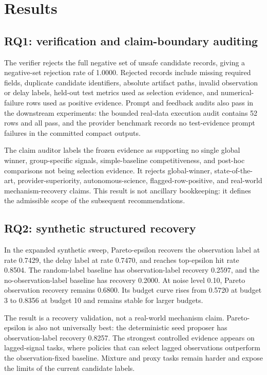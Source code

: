 \section{Results}

\subsection{RQ1: verification and claim-boundary auditing}

The verifier rejects the full negative set of unsafe candidate records, giving
a negative-set rejection rate of \num{1.0000}. Rejected records include
missing required fields, duplicate candidate identifiers, absolute artifact
paths, invalid observation or delay labels, held-out test metrics used as
selection evidence, and numerical-failure rows used as positive evidence.
Prompt and feedback audits also pass in the downstream experiments: the
bounded real-data execution audit contains 52 rows and all pass, and the
provider benchmark records no test-evidence prompt failures in the committed
compact outputs.

The claim auditor labels the frozen evidence as supporting no single global
winner, group-specific signals, simple-baseline competitiveness, and
post-hoc comparisons not being selection evidence. It rejects global-winner,
state-of-the-art, provider-superiority, autonomous-science,
flagged-row-positive, and real-world mechanism-recovery claims. This result is
not ancillary bookkeeping: it defines the admissible scope of the subsequent
recommendations.

\subsection{RQ2: synthetic structured recovery}

In the expanded synthetic sweep, Pareto-epsilon recovers the observation label
at rate \num{0.7429}, the delay label at rate \num{0.7470}, and reaches
top-epsilon hit rate \num{0.8504}. The random-label baseline has
observation-label recovery \num{0.2597}, and the no-observation-label baseline
has recovery \num{0.2000}. At noise level \num{0.10}, Pareto observation
recovery remains \num{0.6800}. Its budget curve rises from \num{0.5720} at
budget 3 to \num{0.8356} at budget 10 and remains stable for larger budgets.

The result is a recovery validation, not a real-world mechanism claim.
Pareto-epsilon is also not universally best: the deterministic seed proposer
has observation-label recovery \num{0.8257}. The strongest controlled evidence
appears on lagged-signal tasks, where policies that can select lagged
observations outperform the observation-fixed baseline. Mixture and proxy
tasks remain harder and expose the limits of the current candidate labels.

